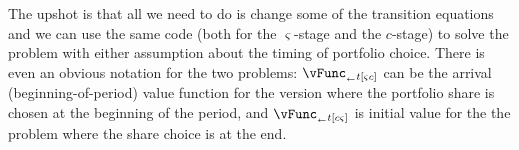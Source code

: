 The upshot is that all we need to do is change some of the transition equations and we can use the same code (both for the $\varsigma$-stage and the ${c}$-stage) to solve the problem with either assumption about the timing of portfolio choice.  There is even an obvious notation for the two problems: $\vFunc_{_\leftarrow t[\varsigma{c}]}$ can be the arrival (beginning-of-period) value function for the version where the portfolio share is chosen at the beginning of the period, and $\vFunc_{_\leftarrow t[{c}\varsigma]}$ is initial value for the the problem where the share choice is at the end.






